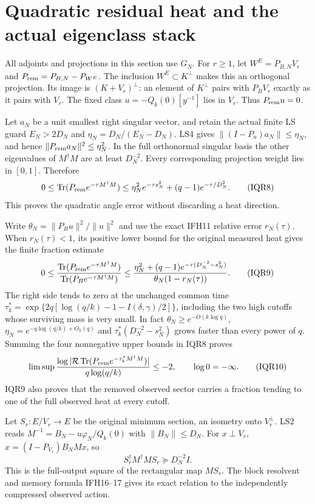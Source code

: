 \documentclass[11pt]{article}
\begin{document}
\section{Quadratic residual heat and the actual eigenclass stack}
All adjoints and projections in this section use $G_N$.
For $r\ge1$, let $W^E=P_{B,N}V_r$ and
$P_{\rm rem}=P_{B,N}-P_{W^E}$.
The inclusion $W^E\subset K^\perp$ makes this an orthogonal projection.
Its image is $(K+V_r)^\perp$: an element of $K^\perp$ pairs
with $P_BV_r$ exactly as it pairs with $V_r$.
The fixed class $u=-Q_k(0)[y^{-1}]$ lies in $V_r$.
Thus $P_{\rm rem}u=0$.

Let $a_N$ be a unit smallest right singular vector, and retain the
actual finite LS guard $E_N>2D_N$ and $\eta_N=D_N/(E_N-D_N)$.
LS4 gives $\|(I-P_u)a_N\|\le\eta_N$, and hence
$\|P_{\rm rem}a_N\|^2\le\eta_N^2$. In the full orthonormal singular
basis the other eigenvalues of $M^\dagger M$ are at least $D_N^{-2}$.
Every corresponding projection weight lies in $[0,1]$. Therefore
\[
0\le\operatorname{Tr}(P_{\rm rem}e^{-\tau M^\dagger M})
\le \eta_N^2e^{-\tau s_N^2}+(q-1)e^{-\tau/D_N^2}.
\tag{IQR8}
\]
This proves the quadratic angle error without discarding a heat direction.

Write $\theta_N=\|P_Bu\|^2/\|u\|^2$ and use the exact IFH11
relative error $r_N(\tau)$. When $r_N(\tau)<1$, its positive lower
bound for the original measured heat gives the finite fraction estimate
\[
0\le
\frac{\operatorname{Tr}(P_{\rm rem}e^{-\tau M^\dagger M})}
     {\operatorname{Tr}(P_Be^{-\tau M^\dagger M})}
\le
\frac{\eta_N^2+(q-1)e^{-\tau(D_N^{-2}-s_N^2)}}
     {\theta_N(1-r_N(\tau))}.
\tag{IQR9}
\]
The right side tends to zero at the unchanged common time
$\tau_k^*=\exp\{2q[\log(q/k)-1-I(\delta,\gamma)/2]\}$,
including the two high cutoffs whose surviving mass is very small.
In fact $\theta_N\ge e^{-O(k\log q)}$,
$\eta_N=e^{-q\log(q/k)+O_h(q)}$ and
$\tau_k^*(D_N^{-2}-s_N^2)$ grows faster than every power of $q$.
Summing the four nonnegative upper bounds in IQR8 proves
\[
\limsup\frac{\log|\mathcal R\operatorname{Tr}
(P_{\rm rem}e^{-\tau_k^*M^\dagger M})|}
{q\log(q/k)}\le-2,\qquad \log0=-\infty .
\tag{IQR10}
\]
IQR9 also proves that the removed observed sector carries a fraction
tending to one of the full observed heat at every cutoff.

Let $S_r:E/V_r\to E$ be the original minimum section, an isometry
onto $V_r^\perp$. LS2 reads $M^{-1}=B_N-u\varphi_N/Q_k(0)$
with $\|B_N\|\le D_N$. For $x\perp V_r$,
$x=(I-P_{V_r})B_NMx$, so
\[
S_r^\dagger M^\dagger MS_r\succeq D_N^{-2}I.
\tag{IQR11}
\]
This is the full-output square of the rectangular map $MS_r$.
The block resolvent and memory formula IFH16--17 gives its exact
relation to the independently compressed observed action.
\end{document}

